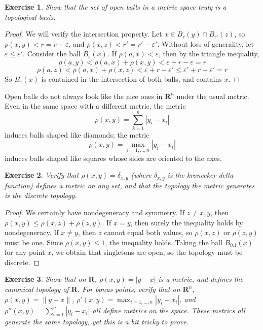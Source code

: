 \documentclass{report}
\theoremstyle{plain}
\newtheorem{exercise}{Exercise}[section]
\theoremstyle{definition}
\begin{document}
\begin{exercise}
    Show that the set of open balls in a metric space truly is a topological basis.
\end{exercise}
\begin{proof}
    We will verify the intersection property. Let $x \in B_r(y) \cap B_{r'}(z)$, so $\rho(x,y) < r = r - \varepsilon$, and $\rho(x,z) < r' = r' - \varepsilon'$. Without loss of generality, let $\varepsilon \leq \varepsilon'$. Consider the ball $B_\varepsilon(x)$. If $\rho(a,x) < \varepsilon$, then by the triangle inequality,
    \[ \rho(a,y) < \rho(a,x) + \rho(x,y) < \varepsilon + r - \varepsilon = r \]
    \[ \rho(a,z) < \rho(a,x) + \rho(x,z) < \varepsilon + r - \varepsilon' \leq \varepsilon' + r - \varepsilon' = r \]
    So $B_\varepsilon(x)$ is contained in the intersection of both balls, and contains $x$.
\end{proof}

Open balls do not always look like the nice ones in $\mathbf{R}^n$ under the usual metric. Even in the same space with a different metric, the metric
%
\[ \rho(x,y) = \sum_{k = 1}^n |y_i - x_i| \]
%
induces balls shaped like diamonds; the metric
%
\[ \rho(x,y) = \max_{i = 1,\dots,n} |y_i - x_i| \]
%
induces balls shaped like squares whose sides are oriented to the axes.

\begin{exercise}
    Verify that $\rho(x,y) = \delta_{x,y}$ (where $\delta_{x,y}$ is the kronecker delta function) defines a metric on any set, and that the topology the metric generates is the discrete topology.
\end{exercise}
\begin{proof}
    We certainly have nondegeneracy and symmetry. If $z \neq x,y$, then $\rho(x,y) \leq \rho(x,z) + \rho(z,y)$. If $x = y$, then surely the inequality holds by nondegeneracy. If $x \neq y$, then $z$ cannot equal both values, so $\rho(x,z)$ or $\rho(z,y)$ must be one. Since $\rho(x,y) \leq 1$, the inequality holds. Taking the ball $B_{0.1}(x)$ for any point $x$, we obtain that singletons are open, so the topology must be discrete.
\end{proof}

\begin{exercise}
    Show that on $\mathbf{R}$, $\rho(x,y) = |y - x|$ is a metric, and defines the canonical topology of $\mathbf{R}$. For bonus points, verify that on $\mathbf{R}^n$, $\rho(x,y) = \|y - x\|$, $\rho'(x,y) = \max_{i = 1,\dots,n} |y_i - x_i|$, and $\rho''(x,y) = \sum_{i = 1}^n |y_i - x_i|$ all define metrics on the space. These metrics all generate the same topology, yet this is a bit tricky to prove.
\end{exercise}
\end{document}
